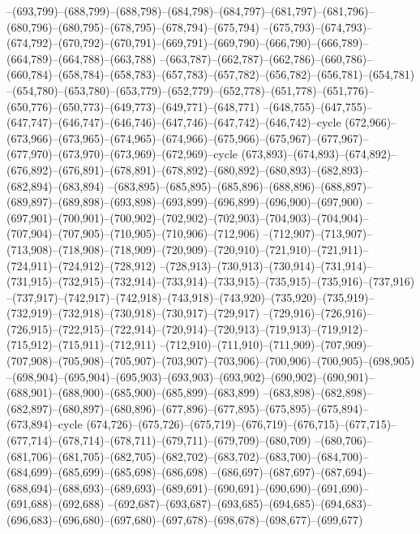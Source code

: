 --(693,799)--(688,799)--(688,798)--(684,798)--(684,797)--(681,797)--(681,796)--(680,796)--(680,795)--(678,795)--(678,794)--(675,794)
--(675,793)--(674,793)--(674,792)--(670,792)--(670,791)--(669,791)--(669,790)--(666,790)--(666,789)--(664,789)--(664,788)--(663,788)
--(663,787)--(662,787)--(662,786)--(660,786)--(660,784)--(658,784)--(658,783)--(657,783)--(657,782)--(656,782)--(656,781)--(654,781)
--(654,780)--(653,780)--(653,779)--(652,779)--(652,778)--(651,778)--(651,776)--(650,776)--(650,773)--(649,773)--(649,771)--(648,771)
--(648,755)--(647,755)--(647,747)--(646,747)--(646,746)--(647,746)--(647,742)--(646,742)--cycle
(672,966)--(673,966)--(673,965)--(674,965)--(674,966)--(675,966)--(675,967)--(677,967)--(677,970)--(673,970)--(673,969)--(672,969)--cycle
(673,893)--(674,893)--(674,892)--(676,892)--(676,891)--(678,891)--(678,892)--(680,892)--(680,893)--(682,893)--(682,894)--(683,894)
--(683,895)--(685,895)--(685,896)--(688,896)--(688,897)--(689,897)--(689,898)--(693,898)--(693,899)--(696,899)--(696,900)--(697,900)
--(697,901)--(700,901)--(700,902)--(702,902)--(702,903)--(704,903)--(704,904)--(707,904)--(707,905)--(710,905)--(710,906)--(712,906)
--(712,907)--(713,907)--(713,908)--(718,908)--(718,909)--(720,909)--(720,910)--(721,910)--(721,911)--(724,911)--(724,912)--(728,912)
--(728,913)--(730,913)--(730,914)--(731,914)--(731,915)--(732,915)--(732,914)--(733,914)--(733,915)--(735,915)--(735,916)--(737,916)
--(737,917)--(742,917)--(742,918)--(743,918)--(743,920)--(735,920)--(735,919)--(732,919)--(732,918)--(730,918)--(730,917)--(729,917)
--(729,916)--(726,916)--(726,915)--(722,915)--(722,914)--(720,914)--(720,913)--(719,913)--(719,912)--(715,912)--(715,911)--(712,911)
--(712,910)--(711,910)--(711,909)--(707,909)--(707,908)--(705,908)--(705,907)--(703,907)--(703,906)--(700,906)--(700,905)--(698,905)
--(698,904)--(695,904)--(695,903)--(693,903)--(693,902)--(690,902)--(690,901)--(688,901)--(688,900)--(685,900)--(685,899)--(683,899)
--(683,898)--(682,898)--(682,897)--(680,897)--(680,896)--(677,896)--(677,895)--(675,895)--(675,894)--(673,894)--cycle
(674,726)--(675,726)--(675,719)--(676,719)--(676,715)--(677,715)--(677,714)--(678,714)--(678,711)--(679,711)--(679,709)--(680,709)
--(680,706)--(681,706)--(681,705)--(682,705)--(682,702)--(683,702)--(683,700)--(684,700)--(684,699)--(685,699)--(685,698)--(686,698)
--(686,697)--(687,697)--(687,694)--(688,694)--(688,693)--(689,693)--(689,691)--(690,691)--(690,690)--(691,690)--(691,688)--(692,688)
--(692,687)--(693,687)--(693,685)--(694,685)--(694,683)--(696,683)--(696,680)--(697,680)--(697,678)--(698,678)--(698,677)--(699,677)
